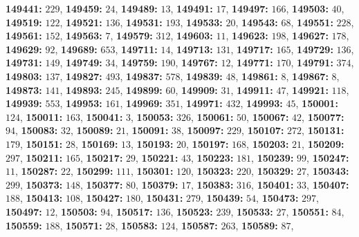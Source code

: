 \textsf{\bfseries 149441:} $229$, \textsf{\bfseries 149459:} $24$, \textsf{\bfseries 149489:} $13$, \textsf{\bfseries 149491:} $17$, \textsf{\bfseries 149497:} $166$, \textsf{\bfseries 149503:} $40$, \textsf{\bfseries 149519:} $122$, \textsf{\bfseries 149521:} $136$, \textsf{\bfseries 149531:} $193$, \textsf{\bfseries 149533:} $20$, \textsf{\bfseries 149543:} $68$, \textsf{\bfseries 149551:} $228$, \textsf{\bfseries 149561:} $152$, \textsf{\bfseries 149563:} $7$, \textsf{\bfseries 149579:} $312$, \textsf{\bfseries 149603:} $11$, \textsf{\bfseries 149623:} $198$, \textsf{\bfseries 149627:} $178$, \textsf{\bfseries 149629:} $92$, \textsf{\bfseries 149689:} $653$, \textsf{\bfseries 149711:} $14$, \textsf{\bfseries 149713:} $131$, \textsf{\bfseries 149717:} $165$, \textsf{\bfseries 149729:} $136$, \textsf{\bfseries 149731:} $149$, \textsf{\bfseries 149749:} $34$, \textsf{\bfseries 149759:} $190$, \textsf{\bfseries 149767:} $12$, \textsf{\bfseries 149771:} $170$, \textsf{\bfseries 149791:} $374$, \textsf{\bfseries 149803:} $137$, \textsf{\bfseries 149827:} $493$, \textsf{\bfseries 149837:} $578$, \textsf{\bfseries 149839:} $48$, \textsf{\bfseries 149861:} $8$, \textsf{\bfseries 149867:} $8$, \textsf{\bfseries 149873:} $141$, \textsf{\bfseries 149893:} $245$, \textsf{\bfseries 149899:} $60$, \textsf{\bfseries 149909:} $31$, \textsf{\bfseries 149911:} $47$, \textsf{\bfseries 149921:} $118$, \textsf{\bfseries 149939:} $553$, \textsf{\bfseries 149953:} $161$, \textsf{\bfseries 149969:} $351$, \textsf{\bfseries 149971:} $432$, \textsf{\bfseries 149993:} $45$, \textsf{\bfseries 150001:} $124$, \textsf{\bfseries 150011:} $163$, \textsf{\bfseries 150041:} $3$, \textsf{\bfseries 150053:} $326$, \textsf{\bfseries 150061:} $50$, \textsf{\bfseries 150067:} $42$, \textsf{\bfseries 150077:} $94$, \textsf{\bfseries 150083:} $32$, \textsf{\bfseries 150089:} $21$, \textsf{\bfseries 150091:} $38$, \textsf{\bfseries 150097:} $229$, \textsf{\bfseries 150107:} $272$, \textsf{\bfseries 150131:} $179$, \textsf{\bfseries 150151:} $28$, \textsf{\bfseries 150169:} $13$, \textsf{\bfseries 150193:} $20$, \textsf{\bfseries 150197:} $168$, \textsf{\bfseries 150203:} $21$, \textsf{\bfseries 150209:} $297$, \textsf{\bfseries 150211:} $165$, \textsf{\bfseries 150217:} $29$, \textsf{\bfseries 150221:} $43$, \textsf{\bfseries 150223:} $181$, \textsf{\bfseries 150239:} $99$, \textsf{\bfseries 150247:} $11$, \textsf{\bfseries 150287:} $22$, \textsf{\bfseries 150299:} $111$, \textsf{\bfseries 150301:} $120$, \textsf{\bfseries 150323:} $220$, \textsf{\bfseries 150329:} $27$, \textsf{\bfseries 150343:} $299$, \textsf{\bfseries 150373:} $148$, \textsf{\bfseries 150377:} $80$, \textsf{\bfseries 150379:} $17$, \textsf{\bfseries 150383:} $316$, \textsf{\bfseries 150401:} $33$, \textsf{\bfseries 150407:} $188$, \textsf{\bfseries 150413:} $108$, \textsf{\bfseries 150427:} $180$, \textsf{\bfseries 150431:} $279$, \textsf{\bfseries 150439:} $54$, \textsf{\bfseries 150473:} $297$, \textsf{\bfseries 150497:} $12$, \textsf{\bfseries 150503:} $94$, \textsf{\bfseries 150517:} $136$, \textsf{\bfseries 150523:} $239$, \textsf{\bfseries 150533:} $27$, \textsf{\bfseries 150551:} $84$, \textsf{\bfseries 150559:} $188$, \textsf{\bfseries 150571:} $28$, \textsf{\bfseries 150583:} $124$, \textsf{\bfseries 150587:} $263$, \textsf{\bfseries 150589:} $87$, 
